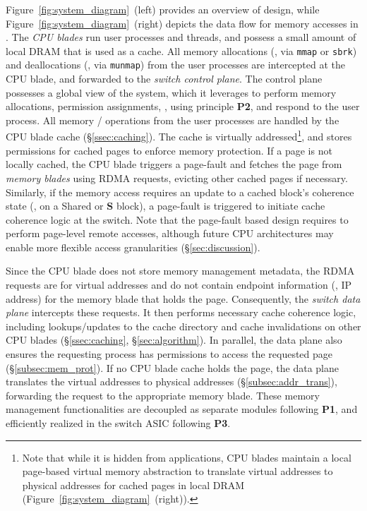 Figure~\ref{fig:system_diagram}~(left) provides an overview of \mind design, while Figure~\ref{fig:system_diagram}~(right) depicts the data flow for memory accesses in \mind. The \textit{CPU blades} run user processes and threads, and possess a small amount of local DRAM that is used as a cache. All memory allocations (\eg, via \texttt{mmap} or \texttt{sbrk}) and deallocations (\eg, via \texttt{munmap}) from the user processes are intercepted at the CPU blade, and forwarded to the \textit{switch control plane}. The control plane possesses a global view of the system, which it leverages to perform memory allocations, permission assignments, \etc, using principle \textbf{P2}, and respond to the user process. All memory / operations from the user processes are handled by the CPU blade cache (\S\ref{ssec:caching}). The cache is virtually addressed\footnote{Note that while it is hidden from applications, CPU blades maintain a local page-based virtual memory abstraction to translate \mind virtual addresses to physical addresses for cached pages in local DRAM (Figure~\ref{fig:system_diagram}~(right)).}, and stores permissions for cached pages to enforce memory protection. If a page is not locally cached, the CPU blade triggers a page-fault and fetches the page from \textit{memory blades} using RDMA requests, evicting other cached pages if necessary. Similarly, if the memory access requires an update to a cached block's coherence state (\eg,  on a Shared or \textbf{S} block), a page-fault is triggered to initiate cache coherence logic at the switch. Note that the page-fault based design requires \mind to perform page-level remote accesses, although future CPU architectures may enable more flexible access granularities (\S\ref{sec:discussion}).

Since the CPU blade does not store memory management metadata, the RDMA requests are for virtual addresses and do not contain endpoint information (\eg, IP address) for the memory blade that holds the page. Consequently, the \textit{switch data plane} intercepts these requests. It then performs necessary cache coherence logic, including lookups/updates to the cache directory and cache invalidations on other CPU blades (\S\ref{ssec:caching}, \S\ref{sec:algorithm}). In parallel, the data plane also ensures the requesting process has permissions to access the requested page (\S\ref{subsec:mem_prot}). If no CPU blade cache holds the page, the data plane translates the virtual addresses to physical addresses (\S\ref{subsec:addr_trans}), forwarding the request to the appropriate memory blade. These memory management functionalities are decoupled as separate modules following \textbf{P1}, and efficiently realized in the switch ASIC following \textbf{P3}.

